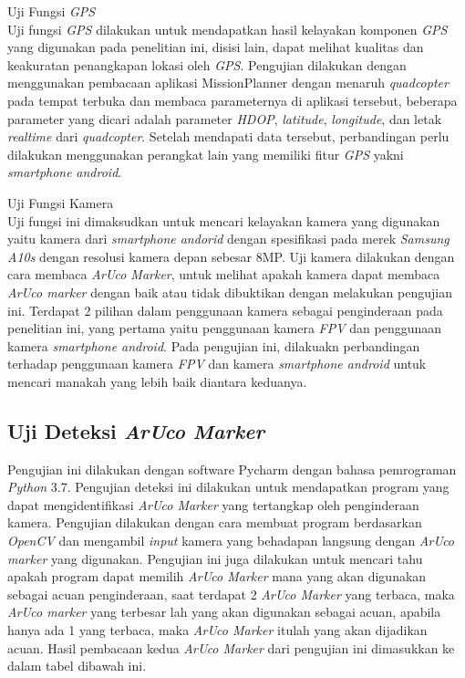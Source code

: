 \begin{packed_item}
\begin{packed_item}
		\item [e.] Uji Fungsi \textit{GPS}
		\\ Uji fungsi \textit{GPS} dilakukan untuk mendapatkan hasil kelayakan komponen \textit{GPS} yang digunakan pada penelitian ini, disisi lain, dapat melihat kualitas dan keakuratan penangkapan lokasi oleh \textit{GPS}.
		Pengujian dilakukan dengan menggunakan pembacaan aplikasi MissionPlanner dengan menaruh \textit{quadcopter} pada tempat terbuka dan membaca parameternya di aplikasi tersebut, beberapa parameter yang dicari adalah parameter \textit{HDOP}, \textit{latitude}, \textit{longitude}, dan letak \textit{realtime} dari \textit{quadcopter}. Setelah mendapati data tersebut, perbandingan perlu dilakukan menggunakan perangkat lain yang memiliki fitur \textit{GPS} yakni \textit{smartphone} \textit{android}.
		
		\item [f.] Uji Fungsi Kamera
		\\Uji fungsi ini dimaksudkan untuk mencari kelayakan kamera yang digunakan yaitu kamera dari \textit{smartphone andorid} dengan spesifikasi pada merek \textit{Samsung A10s} dengan resolusi kamera depan sebesar 8MP. 
		Uji kamera dilakukan dengan cara membaca \textit{ArUco Marker}, untuk melihat apakah kamera dapat membaca \textit{ArUco marker} dengan baik atau tidak dibuktikan dengan melakukan pengujian ini.
		Terdapat 2 pilihan dalam penggunaan kamera sebagai penginderaan pada penelitian ini, yang pertama yaitu penggunaan kamera \textit{FPV} dan penggunaan kamera \textit{smartphone android}. Pada pengujian ini, dilakuakn perbandingan terhadap penggunaan kamera \textit{FPV} dan kamera \textit{smartphone android} untuk mencari manakah yang lebih baik diantara keduanya.
		
	\end{packed_item}
\end{packed_item}


\subsection{Uji Deteksi \textit{ArUco Marker}}
Pengujian ini dilakukan dengan software Pycharm dengan bahasa pemrograman \textit{Python} 3.7. Pengujian deteksi ini dilakukan untuk mendapatkan program yang dapat mengidentifikasi \textit{ArUco Marker} yang tertangkap oleh penginderaan kamera. Pengujian dilakukan dengan cara membuat program berdasarkan \textit{OpenCV} dan mengambil \textit{input} kamera yang behadapan langsung dengan \textit{ArUco marker} yang digunakan.
Pengujian ini juga dilakukan untuk mencari tahu apakah program dapat memilih \textit{ArUco Marker} mana yang akan digunakan sebagai acuan penginderaan, saat terdapat 2 \textit{ArUco Marker} yang terbaca, maka \textit{ArUco marker} yang terbesar lah yang akan digunakan sebagai acuan, apabila hanya ada 1 yang terbaca, maka \textit{ArUco Marker} itulah yang akan dijadikan acuan. Hasil pembacaan kedua \textit{ArUco Marker} dari pengujian ini dimasukkan ke dalam tabel dibawah ini.

